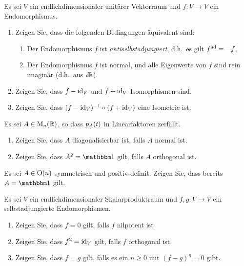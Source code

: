\documentclass[a4paper, 10pt]{scrartcl}
\begin{document}
\begin{question}
  Es sei $V$ ein endlichdimensionaler unitärer Vektorraum und $f \colon V \to V$ ein Endomorphismus.
  \begin{enumerate}
    \item
      Zeigen Sie, dass die folgenden Bedingungen äquivalent sind:
      \begin{enumerate}
        \item
          Der Endomorphismus $f$ ist \emph{antiselbstadjungiert}, d.h.\ es gilt $f^{\operatorname{ad}} = -f$.
        \item
          Der Endomorphismus $f$ ist normal, und alle Eigenwerte von $f$ sind rein imaginär (d.h.\ aus $i \mathbb{R}$).
      \end{enumerate}
    \item
      Zeigen Sie, dass $f - \operatorname{id}_V$ und $f + \operatorname{id}_V$ Isomorphismen sind.
    \item
      Zeigen Sie, dass $(f - \operatorname{id}_V)^{-1} \circ (f + \operatorname{id}_V)$ eine Isometrie ist.
  \end{enumerate}
\end{question}





\begin{question}
  Es sei $A \in \operatorname{M}_{n}(\mathbb{R})$, so dass $p_{A}(t)$ in Linearfaktoren zerfällt.
  \begin{enumerate}
    \item
      Zeigen Sie, dass $A$ diagonalisierbar ist, falls $A$ normal ist.
    \item
      Zeigen Sie, dass $A^2 = \Id$ gilt, falls $A$ orthogonal ist.
  \end{enumerate}
\end{question}





\begin{question}
  Es sei $A \in \operatorname{O}(n)$ symmetrisch und positiv definit.
  Zeigen Sie, dass bereits $A = \Id$ gilt.
\end{question}





\begin{question}
  Es sei $V$ ein endlichdimensionaler Skalarproduktraum und $f, g \colon V \to V$ ein selbstadjungierte Endomorphismen.
  \begin{enumerate}
    \item
      Zeigen Sie, dass $f = 0$ gilt, falls $f$ nilpotent ist
    \item
      Zeigen Sie, dass $f^2 = \operatorname{id}_V$ gilt, falls $f$ orthogonal ist.
    \item
      Zeigen Sie, dass $f = g$ gilt, falls es ein $n \geq 0$ mit $(f-g)^n = 0$ gibt.
  \end{enumerate}
\end{question}
\end{document}
